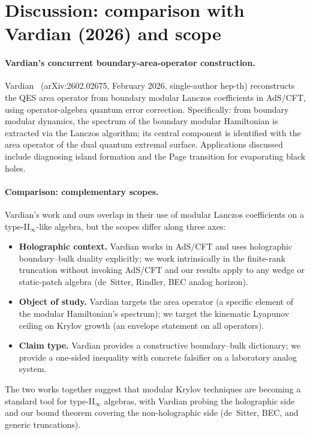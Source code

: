 \documentclass[12pt,a4paper]{article}
\begin{document}
\section{Discussion: comparison with Vardian (2026) and scope}
\label{sec:discussion}

\paragraph{Vardian's concurrent boundary-area-operator construction.}
Vardian~\cite{Vardian2026} (arXiv:2602.02675, February 2026,
single-author hep-th) reconstructs the QES area operator from
boundary modular Lanczos coefficients in AdS/CFT, using
operator-algebra quantum error correction.
Specifically: from boundary modular dynamics,
the spectrum of the boundary modular Hamiltonian is extracted via
the Lanczos algorithm; its central component is identified with the
area operator of the dual quantum extremal surface.
Applications discussed include diagnosing island formation
and the Page transition for evaporating black holes.

\paragraph{Comparison: complementary scopes.}
Vardian's work and ours overlap in their use of modular Lanczos
coefficients on a type-II$_\infty$-like algebra, but the scopes
differ along three axes:
\begin{itemize}
\item \textbf{Holographic context.}
Vardian works in AdS/CFT and uses holographic boundary--bulk duality
explicitly; we work intrinsically in the finite-rank truncation
without invoking AdS/CFT and our results apply to any wedge or
static-patch algebra (de~Sitter, Rindler, BEC analog horizon).
\item \textbf{Object of study.}
Vardian targets the area operator (a specific element of the
modular Hamiltonian's spectrum); we target the kinematic Lyapunov
ceiling on Krylov growth (an envelope statement on all operators).
\item \textbf{Claim type.}
Vardian provides a constructive boundary--bulk dictionary;
we provide a one-sided inequality with concrete falsifier on a
laboratory analog system.
\end{itemize}
The two works together suggest that modular Krylov techniques are
becoming a standard tool for type-II$_\infty$ algebras, with
Vardian probing the holographic side and our bound theorem
covering the non-holographic side (de~Sitter, BEC, and generic
truncations).
\end{document}

